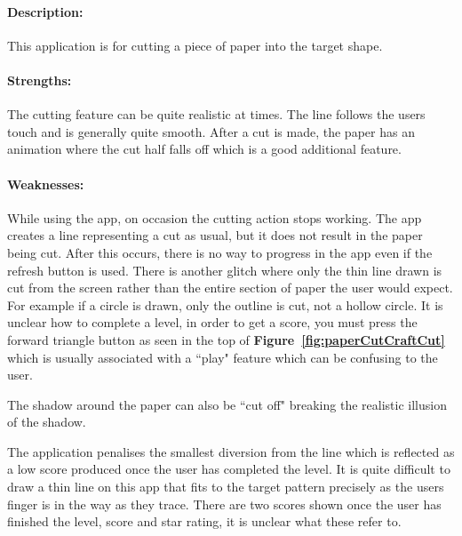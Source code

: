 \documentclass[11pt]{article}
\begin{document}
                \paragraph{Description:} This application is for cutting a piece of paper into the target shape. 
                
                \paragraph{Strengths:}
                The cutting feature can be quite realistic at times. The line follows the users touch and is generally quite smooth. After a cut is made, the paper has an animation where the cut half falls off which is a good additional feature.
                
                \paragraph{Weaknesses:}
                While using the app, on occasion the cutting action stops working. The app creates a line representing a cut as usual, but it does not result in the paper being cut. After this occurs, there is no way to progress in the app even if the refresh button is used. There is another glitch where only the thin line drawn is cut from the screen rather than the entire section of paper the user would expect. For example if a circle is drawn, only the outline is cut, not a hollow circle. 
                It is unclear how to complete a level, in order to get a score, you must press the forward triangle button as seen in the top of \textbf{Figure~\ref{fig:paperCutCraftCut}} which is usually associated with a ``play" feature which can be confusing to the user. 
                
                The shadow around the paper can also be ``cut off" breaking the realistic illusion of the shadow.
                
                The application penalises the smallest diversion from the line which is reflected as a low score produced once the user has completed the level. It is quite difficult to draw a thin line on this app that fits to the target pattern precisely as the users finger is in the way as they trace. There are two scores shown once the user has finished the level, score and star rating, it is unclear what these refer to. 
                
\end{document}
